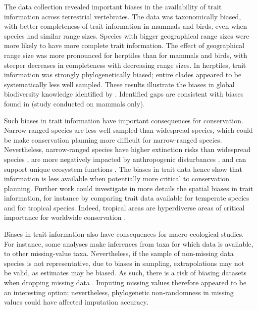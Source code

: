 The data collection revealed important biases in the availability of trait information across terrestrial vertebrates. The data was taxonomically biased, with better completeness of trait information in mammals and birds, even when species had similar range sizes. Species with bigger geographical range sizes were more likely to have more complete trait information. The effect of geographical range size was more pronounced for herptiles than for mammals and birds, with steeper decreases in completeness with decreasing range sizes. In herptiles, trait information was strongly phylogenetically biased;  entire clades appeared to be systematically less well sampled. These results illustrate the biases in global biodiversity knowledge identified by \citet{Hortal2014}. Identified gaps are consistent with biases found in \citet{Gonzalez-Suarez2012} (study conducted on mammals only). 

Such biases in trait information have important consequences for conservation.  Narrow-ranged species are less well sampled than widespread species, which could be make conservation planning more difficult for narrow-ranged species.
Nevertheless, narrow-ranged species have higher extinction risks than widespread species \citep{Collen2016, Purvis2000, Ripple2017}, are more negatively impacted by anthropogenic disturbances \citep{Newbold2018a}, and can support unique ecosystem functions \citep{Mouillot2013}. The biases in trait data hence show that information is less available when potentially more critical to conservation planning. Further work could investigate in more details the spatial biases in trait information, for instance by comparing trait data available for temperate species and for tropical species. Indeed, tropical areas are hyperdiverse areas of critical importance for worldwide conservation \citep{Barlow2018}. 

Biases in trait information also have consequences for macro-ecological studies. For instance, some analyses make inferences from taxa for which data is available, to other missing-value taxa. Nevertheless, if the sample of non-missing data species is not representative, due to biases in sampling, extrapolations may not be valid, as estimates may be biased. As such, there is a risk of biasing datasets when dropping missing data \citep{Nakagawa2008}. Imputing missing values therefore appeared to be an interesting option; nevertheless, phylogenetic non-randomness in missing values could have affected imputation accuracy.

